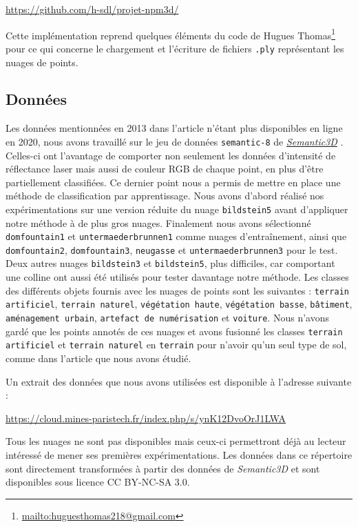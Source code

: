 \documentclass[a4paper, onecolumn, 11pt]{article}
\begin{document}
\begin{center}
	\url{https://github.com/h-sdl/projet-npm3d/} 
\end{center}

Cette implémentation reprend quelques éléments du code de Hugues Thomas\footnote{\url{mailto:huguesthomas218@gmail.com}} pour ce qui concerne le chargement et l'écriture de fichiers \texttt{.ply} représentant les nuages de points.

\subsection{Données}
\label{partie-donnees}
Les données mentionnées en 2013 dans l'article \cite{aka_article} n'étant plus disponibles en ligne en 2020, nous avons travaillé sur le jeu de données \texttt{semantic-8} de \href{http://www.semantic3d.net/}{\emph{Semantic3D}} \cite{hackel2017isprs}. Celles-ci ont l'avantage de comporter non seulement les données d'intensité de réflectance laser mais aussi de couleur RGB de chaque point, en plus d'être partiellement classifiées. Ce dernier point nous a permis de mettre en place une méthode de classification par apprentissage.
Nous avons d'abord réalisé nos expérimentations sur une version réduite du nuage \texttt{bildstein5} avant d'appliquer notre méthode à de plus gros nuages. Finalement nous avons sélectionné \texttt{domfountain1} et \texttt{untermaederbrunnen1} comme nuages d'entraînement, ainsi que \texttt{domfountain2}, \texttt{domfountain3}, \texttt{neugasse} et \texttt{untermaederbrunnen3} pour le test. Deux autres nuages \texttt{bildstein3} et \texttt{bildstein5}, plus difficiles, car comportant une colline ont aussi été utilisés pour tester davantage notre méthode. Les classes des différents objets fournis avec les nuages de points sont les suivantes : \texttt{terrain artificiel}, \texttt{terrain naturel}, \texttt{végétation haute}, \texttt{végétation basse}, \texttt{bâtiment}, \texttt{aménagement urbain}, \texttt{artefact de numérisation} et \texttt{voiture}. Nous n'avons gardé que les points annotés de ces nuages et avons fusionné les classes \texttt{terrain artificiel} et \texttt{terrain naturel} en \texttt{terrain} pour n'avoir qu'un seul type de sol, comme dans l'article que nous avons étudié.

Un extrait des données que nous avons utilisées est disponible à l'adresse suivante : 
\begin{center}
\url{https://cloud.mines-paristech.fr/index.php/s/ynK12DvoOrJ1LWA}
\end{center}
Tous les nuages ne sont pas disponibles mais ceux-ci permettront déjà au lecteur intéressé de mener ses premières expérimentations. Les données dans ce répertoire sont directement transformées à partir des données de \textit{Semantic3D} et sont disponibles sous licence CC BY-NC-SA 3.0.
\end{document}
